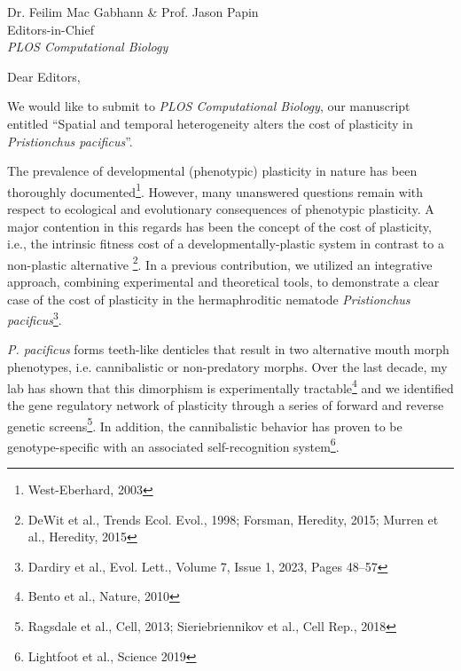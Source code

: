 \documentclass[11pt]{letter} %
\begin{document}


\begin{letter}{Dr. Feilim Mac Gabhann \& Prof. Jason Papin \\ Editors-in-Chief \\ \emph{PLOS Computational Biology}}



\opening{Dear Editors,}

We would like to submit to \emph{PLOS Computational Biology}, our manuscript entitled ``Spatial and temporal heterogeneity alters the cost of plasticity in \emph{Pristionchus pacificus}''.

The prevalence of developmental (phenotypic) plasticity in nature has been thoroughly documented\footnote{West-Eberhard, 2003}. However, many unanswered questions remain with respect to ecological and evolutionary consequences of phenotypic plasticity. A major contention in this regards has been the concept of the cost of plasticity, i.e., the intrinsic fitness cost of a developmentally-plastic system in contrast to a non-plastic alternative \footnote{DeWit et al., Trends Ecol. Evol., 1998; Forsman, Heredity, 2015; Murren et al., Heredity, 2015}. In a previous contribution, we utilized an integrative approach, combining experimental and theoretical tools, to demonstrate a clear case of the cost of plasticity in the hermaphroditic nematode \emph{Pristionchus pacificus}\footnote{Dardiry et al., Evol. Lett., Volume 7, Issue 1, 2023, Pages 48–57}.

\emph{P. pacificus} forms teeth-like denticles that result in two alternative mouth morph phenotypes, i.e. cannibalistic or non-predatory morphs. Over the last decade, my lab has shown that this dimorphism is experimentally tractable\footnote{Bento et al., Nature, 2010} and we identified the gene regulatory network of plasticity through a series of forward and reverse genetic screens\footnote{Ragsdale et al., Cell, 2013; Sieriebriennikov et al., Cell Rep., 2018}. In addition, the cannibalistic behavior has proven to be genotype-specific with an associated self-recognition system\footnote{Lightfoot et al., Science 2019}.


\end{letter}
\end{document}
